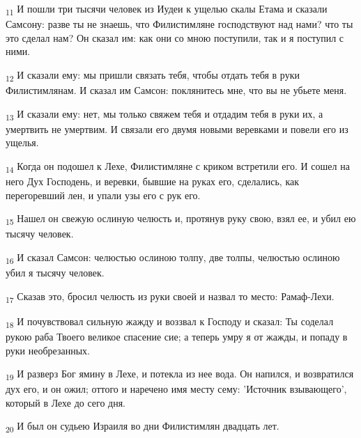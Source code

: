 \begin{tcolorbox}
\textsubscript{11} И пошли три тысячи человек из Иудеи к ущелью скалы Етама и сказали Самсону: разве ты не знаешь, что Филистимляне господствуют над нами? что ты это сделал нам? Он сказал им: как они со мною поступили, так и я поступил с ними.
\end{tcolorbox}
\begin{tcolorbox}
\textsubscript{12} И сказали ему: мы пришли связать тебя, чтобы отдать тебя в руки Филистимлянам. И сказал им Самсон: поклянитесь мне, что вы не убьете меня.
\end{tcolorbox}
\begin{tcolorbox}
\textsubscript{13} И сказали ему: нет, мы только свяжем тебя и отдадим тебя в руки их, а умертвить не умертвим. И связали его двумя новыми веревками и повели его из ущелья.
\end{tcolorbox}
\begin{tcolorbox}
\textsubscript{14} Когда он подошел к Лехе, Филистимляне с криком встретили его. И сошел на него Дух Господень, и веревки, бывшие на руках его, сделались, как перегоревший лен, и упали узы его с рук его.
\end{tcolorbox}
\begin{tcolorbox}
\textsubscript{15} Нашел он свежую ослиную челюсть и, протянув руку свою, взял ее, и убил ею тысячу человек.
\end{tcolorbox}
\begin{tcolorbox}
\textsubscript{16} И сказал Самсон: челюстью ослиною толпу, две толпы, челюстью ослиною убил я тысячу человек.
\end{tcolorbox}
\begin{tcolorbox}
\textsubscript{17} Сказав это, бросил челюсть из руки своей и назвал то место: Рамаф-Лехи.
\end{tcolorbox}
\begin{tcolorbox}
\textsubscript{18} И почувствовал сильную жажду и воззвал к Господу и сказал: Ты соделал рукою раба Твоего великое спасение сие; а теперь умру я от жажды, и попаду в руки необрезанных.
\end{tcolorbox}
\begin{tcolorbox}
\textsubscript{19} И разверз Бог ямину в Лехе, и потекла из нее вода. Он напился, и возвратился дух его, и он ожил; оттого и наречено имя месту сему: 'Источник взывающего', который в Лехе до сего дня.
\end{tcolorbox}
\begin{tcolorbox}
\textsubscript{20} И был он судьею Израиля во дни Филистимлян двадцать лет.
\end{tcolorbox}
